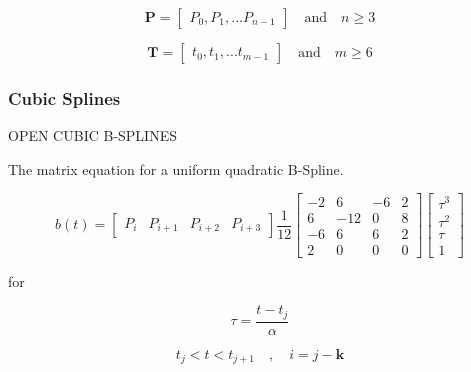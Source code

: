 \documentclass{article}
\begin{document}
   \begin{equation}
        \textbf{P} = \begin{bmatrix} P_0, P_1, ... P_{n-1} \end{bmatrix} \quad \text{and} \quad n \geq 3
    \end{equation}
    
    \begin{equation}
        \textbf{T} = \begin{bmatrix} t_0, t_1, ... t_{m-1} \end{bmatrix} \quad \text{and} \quad m \geq 6
    \end{equation}
    
    
    \subsubsection{Cubic Splines}
    
OPEN CUBIC B-SPLINES
\hfill \break

    The matrix equation for a uniform quadratic B-Spline.
    
    \begin{equation}
        b(t) = \begin{bmatrix} P_i & P_{i+1} & P_{i+2} & P_{i+3} \end{bmatrix} \frac{1}{12} \begin{bmatrix} -2 & 6 & -6 & 2 \\
                                          6 & -12 & 0 & 8 \\
                                         -6 & 6 & 6 & 2 \\
                                          2 & 0 & 0 & 0 \end{bmatrix} \begin{bmatrix} \tau^3 \\ \tau^2 \\ \tau \\ 1 \end{bmatrix}
    \end{equation}
    
    for
    
    \begin{equation}
        \tau = \frac{t-t_j}{\alpha}
    \end{equation}
    
    \begin{equation}
        t_j < t < t_{j+1} \quad , \quad i = j-\textbf{k}
    \end{equation}
    
\end{document}
